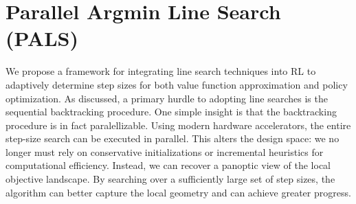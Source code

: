 \documentclass{article}
\newcommand{\stepSizeInit}{\eta_0}
\begin{document}
\section{Parallel Argmin Line Search (PALS)}

We propose a framework for integrating line search techniques into RL to adaptively determine step sizes for both value function approximation and policy optimization. 
As discussed, a primary hurdle to adopting line searches is the sequential backtracking procedure.
One simple insight is that the backtracking procedure is in fact paralellizable.
Using modern hardware accelerators, the entire step-size search can be executed in parallel. This alters the design space: we no longer must rely on conservative initializations or incremental heuristics for computational efficiency. Instead, we can recover a panoptic view of the local objective landscape. By searching over a sufficiently large set of step sizes, the algorithm can better capture the local geometry and can achieve greater progress. 
\end{document}
